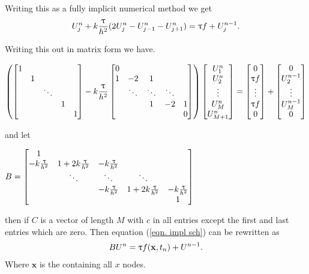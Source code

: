 Writing this as a fully implicit numerical method we get
\begin{eqnarray}
U^{n}_j + k \frac{{\uptau}}{h^2}(2U^{n}_j-U^{n}_{j-1}-U^{n}_{j+1}) ={\uptau} f+U^{n-1}_j.
\end{eqnarray} 

Writing this out in matrix form we have.

\begin{eqnarray} \label{eqn. impl sch}
 \left( \begin{bmatrix}
	1 &  &  &  &  \\
	& 1 &  &  &  \\
	&  & \ddots &  &  \\
	&  &  & 1 &  \\
	&  &  &  & 1 
	\end{bmatrix}  
	- k \frac{ {\uptau}}{h^2}  \begin{bmatrix}
	0 &  &  &  &  \\
	1 & -2 & 1 &  &  \\
	& \ddots & \ddots & \ddots &  \\
	&  & 1 & -2 & 1 \\
	&  &  &  &  0
	\end{bmatrix}  \right) \begin{bmatrix}
U^{n}_1 \\
U^{n}_2 \\
\vdots\\
U^{n}_{M}\\
U^{n}_{M+1}

\end{bmatrix}  
= 
 \begin{bmatrix}
0 \\
{\uptau} f \\
\vdots\\
{\uptau} f \\
0
\end{bmatrix}  
+
 \begin{bmatrix}
0 \\
U^{n-1}_2 \\
\vdots\\
U^{n-1}_{M} \\
0 
\end{bmatrix} 
\end{eqnarray}

and let 
\begin{center}
$ B = \begin{bmatrix}
1 &  &  & & \\
-k \frac{{\uptau}}{h^2} & 1+2 k \frac{{\uptau}}{h^2} & -k \frac{{\uptau}}{h^2} & & \\
& \ddots & \ddots & \ddots \\
& &-k \frac{{\uptau}}{h^2} & 1+2 k \frac{{\uptau}}{h^2} & -k \frac{{\uptau}}{h^2}   \\
& &  &  & 1 
\end{bmatrix}  $
\end{center}
then if $C$ is a vector of length $M$ with $c$ in all entries except the first and last entries which are zero. Then equation (\ref{eqn. impl sch}) can be rewritten as
\begin{eqnarray}
 B U^{n} = {\uptau} f(\mathbf{x},t_n) +U^{n-1}.
\end{eqnarray}
Where $\mathbf{x}$ is the containing all $x$ nodes. 

